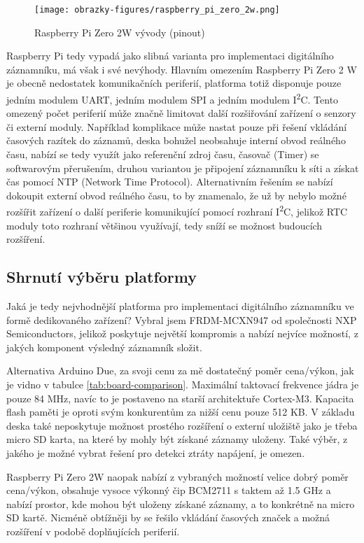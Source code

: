 \begin{figure}[h]
    \centering
    \texttt{[image: obrazky-figures/raspberry\_pi\_zero\_2w.png]}
    
    \caption{Raspberry Pi Zero 2W vývody (pinout) \cite{arduino_shop_due}}
    \label{fig:raspberry-pi-zero-2w}
\end{figure}

Raspberry Pi tedy vypadá jako slibná varianta pro implementaci digitálního záznamníku, má však i své nevýhody. Hlavním omezením Raspberry Pi Zero 2 W je obecně nedostatek komunikačních periferií, platforma totiž disponuje pouze jedním modulem UART, jedním modulem SPI a jedním modulem I\textsuperscript{2}C. 
Tento omezený počet periferií může značně limitovat další rozšiřování zařízení o senzory či externí moduly. Například komplikace může nastat pouze při řešení vkládání časových razítek do záznamů, deska bohužel neobsahuje interní obvod reálného času, nabízí se  tedy využít jako referenční zdroj času, časovač (Timer) se softwarovým přerušením, druhou variantou je připojení záznamníku k síti a získat čas pomocí NTP (Network Time Protocol). Alternativním řešením se nabízí dokoupit externí obvod reálného času, to by znamenalo, že už by nebylo možné rozšířit zařízení o další periferie komunikující pomocí rozhraní I\textsuperscript{2}C, jelikož RTC moduly toto rozhraní většinou využívají, tedy sníží se možnost budoucích rozšíření.

\subsection{Shrnutí výběru platformy}
Jaká je tedy nejvhodnější platforma pro implementaci digitálního záznamníku ve formě dedikovaného zařízení? Vybral jsem FRDM-MCXN947 od společnosti NXP Semiconductors, jelikož poskytuje největší kompromis a nabízí nejvíce možností, z jakých komponent výsledný záznamník složit.

Alternativa Arduino Due, za svoji cenu za mě dostatečný poměr cena/výkon, jak je vidno v tabulce \ref{tab:board-comparison}. Maximální taktovací frekvence jádra je pouze 84 MHz, navíc to je postaveno na starší architektuře Cortex-M3. Kapacita flash paměti je oproti svým konkurentům za nižší cenu pouze 512 KB. V základu deska také neposkytuje možnost prostého rozšíření o externí uložiště jako je třeba micro SD karta, na které by mohly být získané záznamy uloženy. Také výběr, z jakého je možné vybrat řešení pro detekci ztráty napájení, je omezen.

Raspberry Pi Zero 2W naopak nabízí z vybraných možností velice dobrý poměr cena/výkon, obsahuje vysoce výkonný čip BCM2711 s taktem až 1.5 GHz a nabízí prostor, kde mohou být uloženy získané záznamy, a to konkrétně na micro SD kartě. Nicméně obtížněji by se řešilo vkládání časových značek a možná rozšíření v podobě doplňujících periferií.

